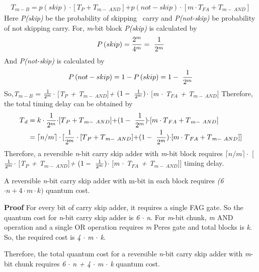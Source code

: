 \begin{align*}
{ T{}_{m-B} = p(skip) \cdot }[{ T{}_{P} + T{}_{m-\ AND}}]{ + p(not-skip)\cdot }[{ m \cdot T{}_{FA} + T{}_{m-\ AND}}]
\end{align*}
\textnormal{
Here {\it P(skip)} be the probability of skipping~ carry and {\it P(not-skip)} be probability of not skipping carry.
For, {\it m}-bit block {\it P(skip)} is calculated by
$${P\left(skip\right)}={{2^m}\over {4^m}}=\ {{1}\over {2^m}}$$
And {\it P(not-skip)} is calculated by
$${P\left(not-skip\right)}={1-P\left(skip\right)}=1-\ {{1}\over {2^m}}$$
{\it }
So,{\it T${}_{m-B}$} = ${{1}\over {2^m}}${\it $\cdot$ }[{\it T${}_{P}$ + T${}_{m-\ AND}$}]{\it + }$(1-\ {{1}\over {2^m}})${\it $\cdot$ }[{\it m $\cdot$ T${}_{FA}$ + T${}_{m-\ AND}$}]
Therefore, the total timing delay can be obtained by
\begin{align*}
T{}_{d} &= k \cdot {{1}\over {2^m}}{ \cdot }[{ T{}_{P} + T{}_{m-\ AND}}]{ + }(1-\ {{1}\over {2^m}}){ \cdot }[{ m \cdot T{}_{FA} + T{}_{m-\ AND}}]\\
&=\lceil{n/m}\rceil \cdot [{{1}\over {2^m}}\cdot[{ T{}_{P} + T{}_{m-\ AND}}]{ + }(1-\ {{1}\over {2^m}}){ \cdot }[{ m \cdot T{}_{FA} + T{}_{m-\ AND}}]]
\end{align*}}
\textnormal{
Therefore, a reversible {\it n}-bit carry skip adder with {\it m}-bit block requires $\lceil{n/m}\rceil\cdot$ [${{1}\over {2^m}}${\it $\cdot$ }[{\it T${}_{P}$ + T${}_{m-\ AND}$}]{\it + }$(1-\ {{1}\over {2^m}})${\it $\cdot$ }[{\it m $\cdot$ T${}_{FA}$ + T${}_{m-\ AND}$}]] timing delay.}



\begin{property}\textnormal{
A reversible {\it n}-bit carry skip adder with m-bit in each block requires {\it (6 $\cdot n + 4 \cdot m \cdot k)$} quantum cost.}
\end{property}

\noindent\textbf{Proof}\textnormal{
For every bit of carry skip adder, it requires a single FAG gate. So the quantum cost for {\it n}-bit carry skip adder is {\it 6 $\cdot$ n}. For {\it m}-bit chunk, {\it m} AND operation and a single OR operation requires {\it m }Peres gate and total blocks is {\it k}. So, the required cost is {\it 4 $\cdot$ m $\cdot$ k}.}

\textnormal{
Therefore, the total quantum cost for a reversible {\it n}-bit carry skip adder with {\it m}-bit chunk requires {\it 6 $\cdot$ n + 4 $\cdot$ m $\cdot$ k} quantum cost.}


